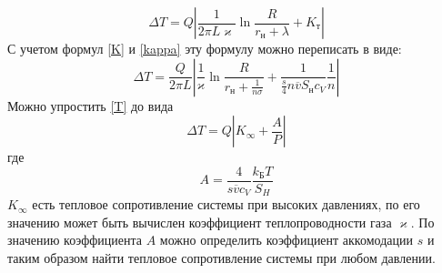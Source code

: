 \documentclass[12pt]{article}
\begin{document}
        \begin{equation}
            \Delta T = Q \left|\frac{1}{2\pi L \varkappa}\ln\frac{R}{r_{\text{н}}+\lambda} + K_{\text{т}} \right|
        \end{equation}
        С учетом формул \ref{K} и \ref{kappa} эту формулу можно переписать в виде:
        \begin{equation}\label{T}
            \Delta T = \frac{Q}{2\pi L}\left| \frac{1}{\varkappa}\ln\frac{R}{r_{\text{н}}+\frac{1}{n\sigma}} +\frac{1}{\frac{s}{4} n \overline{v} S_{\text{н}}c_V} \frac{1}{n}\right|
        \end{equation}
        Можно упростить \ref{T} до вида
        \begin{equation}
            \Delta T = Q \left|K_{\infty} + \frac{A}{P}\right|
        \end{equation}
        где
        \[
            A = \frac{4}{s\overline{v}c_V}\frac{k_{\text{Б}}T}{S_H}
        \]
        $K_{\infty}$ есть тепловое сопротивление системы при высоких давлениях,
        по его значению может быть вычислен коэффициент теплопроводности газа $\varkappa$. По значению коэффициента $A$ можно определить коэффициент
        аккомодации $s$ и таким образом найти тепловое сопротивление системы при любом давлении.
\end{document}
